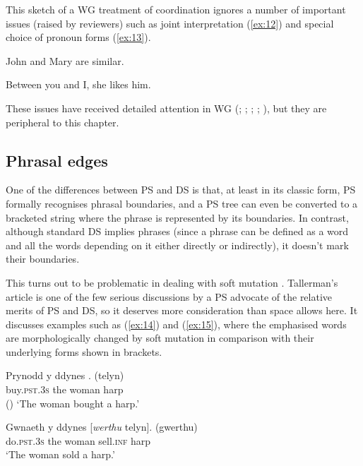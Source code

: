 \documentclass[output=paper
 	        ,biblatex
                ,babelshorthands
                ,newtxmath
                ,draftmode
                ,colorlinks, citecolor=brown
]{langscibook}
\begin{document}
This sketch of a WG treatment of coordination ignores a number of important issues (raised by
reviewers) such as joint interpretation (\ref{ex:12}) and special choice of pronoun forms
(\ref{ex:13}).

\begin{exe}
	\ex \label{ex:12} John and Mary are similar.

	\ex \label{ex:13} Between you and I, she likes him.
\end{exe}

\noindent
These issues have received detailed attention in WG (\citealt[Chapter~5]{Hudson84a-u};
\citeyear{Hudson88a}; \citeyear[Chapter~14]{Hudson90a-u}; \citeyear{Hudson1995}; \citeyear[175--181,
304--307]{Hudson2010b-u}), but they are peripheral to this chapter.


\subsection{Phrasal edges}
\label{sec:4.3}

One of the differences between PS and DS is that, at least in its classic form, PS formally
recognises phrasal boundaries, and a PS tree can even be converted to a bracketed string where the
phrase is represented by its boundaries. In contrast, although standard DS implies phrases (since a
phrase can be defined as a word and all the words depending on it either directly or indirectly), it
doesn't mark their boundaries.

This turns out to be problematic in dealing with  soft mutation
\citep{Tallerman2009}. Tallerman's article is one of the few serious discussions by a PS advocate of
the relative merits of PS and DS, so it deserves more consideration than space allows here. It
discusses examples such as (\ref{ex:14}) and (\ref{ex:15}), where the emphasised words are
morphologically changed by soft mutation in comparison with their underlying forms shown in
brackets.

\begin{exe}
\ex \label{ex:14}
\gll Prynodd                      y   ddynes \emph{}. (telyn)\\
     buy.\textsc{pst}.3\textsc{s} the woman  harp\\\hfill()
\glt `The woman bought a harp.'

\ex \label{ex:15}
\gll Gwnaeth                     y   ddynes [\emph{werthu} telyn]. (gwerthu)\\
     do.\textsc{pst}.3\textsc{s} the woman  \spacebr{}sell.\textsc{inf} harp\\
\glt `The woman sold a harp.'
\end{exe}
\end{document}
